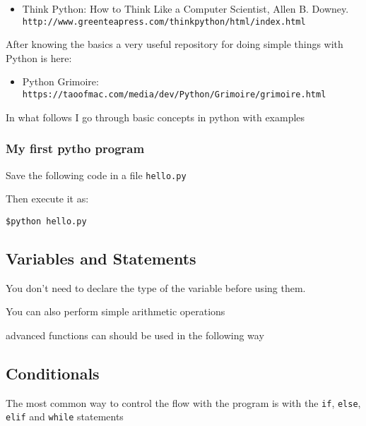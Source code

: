 \documentclass{article}
\begin{document}
\begin{itemize}
\item Think Python: How to Think Like a Computer Scientist, Allen
  B. Downey.\\\verb"http://www.greenteapress.com/thinkpython/html/index.html" 
\end{itemize}

After knowing the basics a very useful repository for doing simple
things with Python is here:  


\begin{itemize}
\item Python Grimoire: \\\verb"https://taoofmac.com/media/dev/Python/Grimoire/grimoire.html"
\end{itemize}

In what follows I go through basic concepts in python with examples

\subsubsection{My first pytho program}

Save the following code in a file \verb"hello.py"


Then execute it as:
\begin{verbatim}
$python hello.py
\end{verbatim}

\subsection{Variables and Statements}
You don't need to declare the type of the variable before using them. 
 




You can also perform simple arithmetic operations




advanced functions can should be used in the following way




\subsection{Conditionals}
The most common way to control the flow with the program is with the
\verb"if", \verb"else", \verb"elif" and \verb"while" statements
\end{document}
